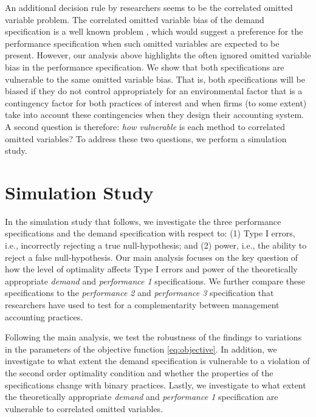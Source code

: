 \documentclass[12pt]{article}
\begin{document}
An additional decision rule by researchers seems to be the correlated omitted variable problem. The correlated omitted variable bias of the demand specification is a well known problem \citep{grabner_management_2013,arora_testing_1996,carree_note_2011}, which would suggest a preference for the performance specification when such omitted variables are expected to be present. However, our analysis above highlights the often ignored omitted variable bias in the performance specification. We show that both specifications are vulnerable to the same omitted variable bias. That is, both specifications will be biased if they do not control appropriately for an environmental factor that is a contingency factor for both practices of interest and when firms (to some extent) take into account these contingencies when they design their accounting system. A second question is therefore: \emph{how vulnerable} is each method to correlated omitted variables? To address these two questions, we perform a simulation study.

\section{Simulation Study}\label{simulation-study}

In the simulation study that follows, we investigate the three performance specifications and the demand specification with respect to: (1) Type I errors, i.e., incorrectly rejecting a true null-hypothesis; and (2) power, i.e., the ability to reject a false null-hypothesis. Our main analysis focuses on the key question of how the level of optimality affects Type I errors and power of the theoretically appropriate \emph{demand} and \emph{performance 1} specifications. We further compare these specifications to the \emph{performance 2} and \emph{performance 3} specification that researchers have used to test for a complementarity between management accounting practices.  

Following the main analysis, we test the robustness of the findings to variations in the parameters of the objective function \eqref{eq:objective}. In addition, we investigate to what extent the demand specification is vulnerable to a violation of the second order optimality condition and whether the properties of the specifications change with binary practices. Lastly, we investigate to what extent the theoretically appropriate \emph{demand} and \emph{performance 1} specification are vulnerable to correlated omitted variables. 
\end{document}
